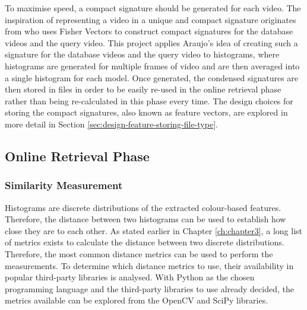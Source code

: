 To maximise speed, a compact signature should be generated for each video. The inspiration of representing a video in a unique and compact signature originates from \cite{araujo2017i2v} who uses Fisher Vectors to construct compact signatures for the database videos and the query video. This project applies Araujo's idea of creating such a signature for the database videos and the query video to histograms, where histograms are generated for multiple frames of video and are then averaged into a single histogram for each model. Once generated, the condensed signatures are then stored in files in order to be easily re-used in the online retrieval phase rather than being re-calculated in this phase every time. The design choices for storing the compact signatures, also known as feature vectors, are explored in more detail in Section \ref{sec:design-feature-storing-file-type}. 


\subsection{Online Retrieval Phase}
\label{sec:design-online-retrieval}

\subsubsection{Similarity Measurement}
\label{sec:design-online-retrieval-similarity-measurement}

Histograms are discrete distributions of the extracted colour-based features. Therefore, the distance between two histograms can be used to establish how close they are to each other. As stated earlier in Chapter \ref{ch:chapter3}, a long list of metrics exists to calculate the distance between two discrete distributions. Therefore, the most common distance metrics can be used to perform the measurements. To determine which distance metrics to use, their availability in popular third-party libraries is analysed. With Python as the chosen programming language and the third-party libraries to use already decided, the metrics available can be explored from the OpenCV and SciPy libraries.\\

